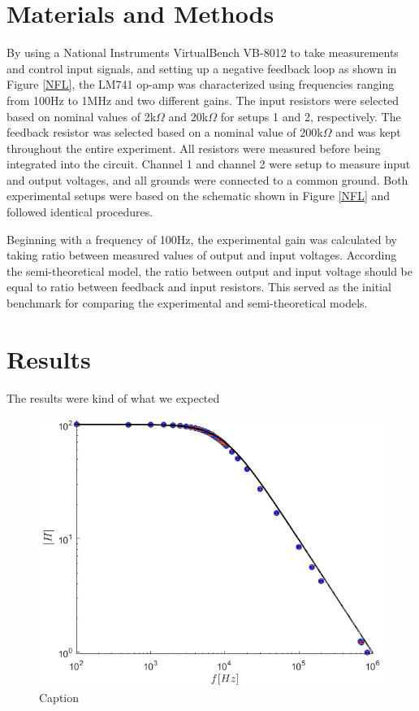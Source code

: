\documentclass[letterpaper,12pt]{article}
\begin{document}
\section{Materials and Methods}
By using a National Instruments VirtualBench VB-8012 to take measurements and control input signals, and setting up a negative feedback loop as shown in Figure \ref{NFL}, the LM741 op-amp was characterized using frequencies ranging from 100Hz to 1MHz and two different gains. The input resistors were selected based on nominal values of 2k$\Omega$ and 20k$\Omega$ for setups 1 and 2, respectively. The feedback resistor was selected based on a nominal value of 200k$\Omega$ and was kept throughout the entire experiment. All resistors were measured before being integrated into the circuit. Channel 1 and channel 2 were setup to measure input and output voltages, and all grounds were connected to a common ground. Both experimental setups were based on the schematic shown in Figure \ref{NFL} and followed identical procedures. 

Beginning with a frequency of 100Hz, the experimental gain was calculated by taking ratio between measured values of output and input voltages. According the semi-theoretical model, the ratio between output and input voltage should be equal to ratio between feedback and input resistors. This served as the initial benchmark for comparing the experimental and semi-theoretical models.





\newpage
\section{Results}
The results were kind of what we expected
\begin{figure}[ht]
    \centering
    \includegraphics[scale = .55]{HighGain.png}
    \caption{Caption}
    \label{HighG}
\end{figure}
\end{document}
